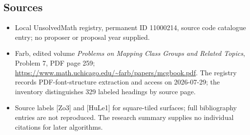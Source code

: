 \documentclass[11pt]{article}
\begin{document}
\subsection{Sources}
\begin{itemize}
\item Local UnsolvedMath registry, permanent ID 11000214, source code catalogue entry; no proposer or proposal year supplied.
\item Farb, edited volume \emph{Problems on Mapping Class Groups and Related Topics}, Problem 7, PDF page 259; \url{https://www.math.uchicago.edu/~farb/papers/mcgbook.pdf}. The registry records PDF-font-structure extraction and access on 2026-07-29; the inventory distinguishes 329 labeled headings by source page.
\item Source labels [Zo3] and [HuLe1] for square-tiled surfaces; full bibliography entries are not reproduced. The research summary supplies no individual citations for later algorithms.
\end{itemize}
\end{document}
